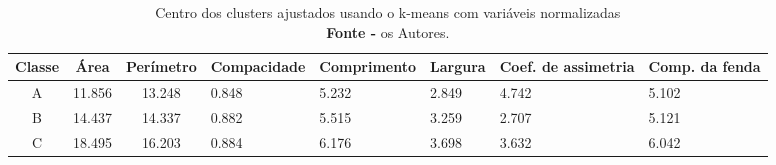 \begin{table}[H]
    \centering
    \begin{tabular}{c c c} 
        \toprule
        \textbf{Classe} & Área & Perímetro & Compacidade & Comprimento & Largura & Coef. de assimetria & Comp. da fenda\\ [0.5ex] 
        \midrule
        A & 11.856 & 13.248 & 0.848 & 5.232 & 2.849 & 4.742 & 5.102\\
        \hline
        B & 14.437 & 14.337 & 0.882 & 5.515 & 3.259 & 2.707 & 5.121 \\
        \hline
        C & 18.495 & 16.203 & 0.884 & 6.176 & 3.698 & 3.632 & 6.042 \\
        \bottomrule
    \end{tabular}
    \caption{\label{tabela_tabuadas} Centro dos clusters ajustados usando o k-means com variáveis normalizadas \\ \textbf{Fonte -} os Autores.}
\end{table}